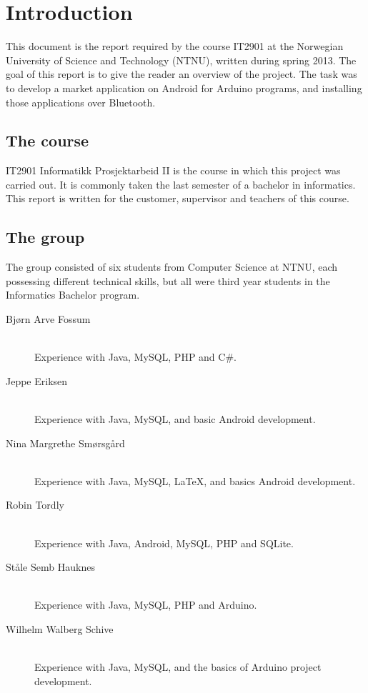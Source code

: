 \chapter{Introduction}

This document is the report required by the course IT2901 at the Norwegian University of Science and Technology (NTNU), written during spring 2013. The goal of this report is to give the reader an overview of the project.
The task was to develop a market application on Android for Arduino programs, and installing those applications over Bluetooth.

\section{The course}
IT2901 Informatikk Prosjektarbeid II is the course in which this project was carried out. It is commonly taken the last semester of a bachelor in informatics. This report is written for the customer, supervisor and teachers of this course.

\section{The group}
The group consisted of six students from Computer Science at NTNU, each possessing different technical skills, but all were third year students in the Informatics Bachelor program.

\begin{description}
	\item[Bjørn Arve Fossum]\hfill \\
		Experience with Java, MySQL, PHP and C\#.
	\item[Jeppe Eriksen]\hfill \\
		Experience with Java, MySQL, and basic Android development.
	\item[Nina Margrethe Smørsgård]\hfill \\
		Experience with Java, MySQL, \LaTeX, and basics Android development.
	\item[Robin Tordly]\hfill \\
		Experience with Java, Android, MySQL, PHP and SQLite.
	\item[Ståle Semb Hauknes]\hfill \\
		Experience with Java, MySQL, PHP and Arduino.
	\item[Wilhelm Walberg Schive]\hfill \\
		Experience with Java, MySQL, and the basics of Arduino project development.
\end{description}


